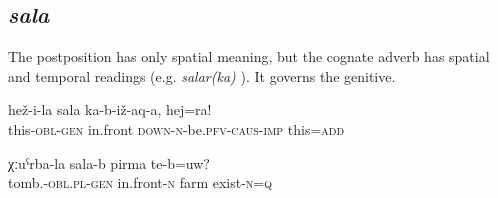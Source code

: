 
\subsection{\textit{sala} }
\label{ssec:postposition sala}
The postposition  has only spatial meaning, but the cognate adverb has spatial and temporal readings (e.g. \textit{salar(ka)} ). It governs the genitive.
%
\begin{exe}
	\ex
	\begin{xlist}
		\ex	\label{Put this before of this, and this also}
		\gll	hež-i-la	sala	ka-b-iž-aq-a,	hej=ra!\\
			this-\textsc{obl}-\textsc{gen}	in.front	\textsc{down-n}-be.\textsc{pfv}-\textsc{caus}-\textsc{imp}	this=\textsc{add}\\
		\glt	{}

		\ex	\label{Is there a farm in front of the graveyard}
		\gll	χːuˁrba-la	sala-b	pirma	te-b=uw?\\
			tomb.-\textsc{obl.pl-gen}	in.front-\textsc{n}	farm	exist-\textsc{n}=\textsc{q}\\
		\glt	{}
	\end{xlist}
\end{exe}



\subsection{ }
\label{ssec:postposition sa}

